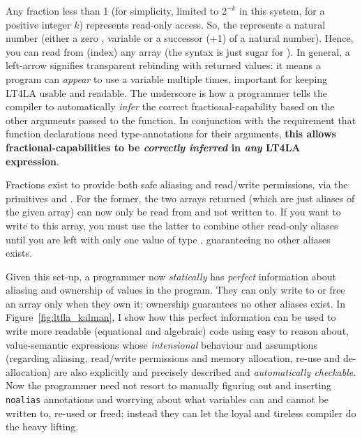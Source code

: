 Any fraction less than 1 (for simplicity, limited to $2^{-k}$ in this system,
for a positive integer $k$) represents read-only access. So, the 
represents a natural number (either a zero , variable  or a
successor (+1) of a natural number). Hence, you can read from (index) any array
 (the syntax  is just sugar for ). In general, a
left-arrow \ltfla{<-} signifies transparent rebinding with returned values: it
means a program can \emph{appear} to use a variable multiple times, important
for keeping LT4LA usable and readable. The underscore is how a programmer tells
the compiler to automatically \emph{infer} the correct fractional-capability
based on the other arguments passed to the function. In conjunction with the
requirement that function declarations need type-annotations for their
arguments, \textbf{this allows fractional-capabilities to be \emph{correctly
inferred} in \emph{any} LT4LA expression}.

Fractions exist to provide both safe aliasing and read/write permissions, via
the primitives  and
.  For the former,
the two arrays returned (which are just aliases of the given array) can now
only be read from and not written to. If you want to write to this array, you
must use the latter to combine other read-only aliases until you are left with
only one value of type , guaranteeing no other aliases exists.

Given this set-up, a programmer now \emph{statically} has \emph{perfect}
information about aliasing and ownership of values in the program. They can
only write to or free an array only when they own it; ownership guarantees no
other aliases exist. In Figure~\ref{fig:ltfla_kalman}, I show how this perfect
information can be used to write more readable (equational and algebraic) code
using easy to reason about, value-semantic expressions whose \emph{intensional}
behaviour and assumptions (regarding aliasing, read/write permissions and
memory allocation, re-use and de-allocation) are also explicitly and precisely
described and \emph{automatically checkable}. Now the programmer need not
resort to manually figuring out and inserting \texttt{noalias} annotations and
worrying about what variables can and cannot be written to, re-used or freed;
instead they can let the loyal and tireless compiler do the heavy lifting.

